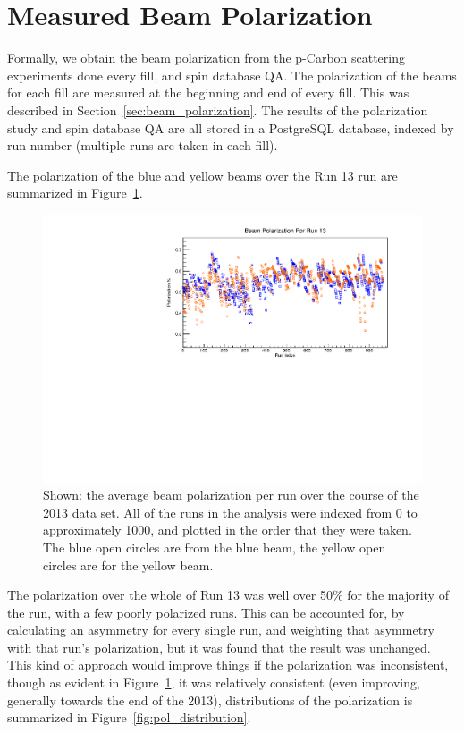 \section{Measured Beam Polarization}

Formally, we obtain the beam polarization from the p-Carbon scattering
experiments done every fill, and spin database QA. The polarization of the beams
for each fill are measured at the beginning and end of every fill. This was
described in Section~\ref{sec:beam_polarization}. The results of the
polarization study and spin database QA are all stored in a PostgreSQL database,
indexed by run number (multiple runs are taken in each fill).

The polarization of the blue and yellow beams over the Run 13 run are summarized
in Figure~\ref{fig:avg_polarization}.

\begin{figure}[ht]
  \centering
  \includegraphics[width=\linewidth]{./figures/beam_polarization.pdf}
  \caption{
    Shown: the average beam polarization per run over the course of the 2013
    data set. All of the runs in the analysis were indexed from 0 to
    approximately 1000, and plotted in the order that they were taken. The blue
    open circles are from the blue beam, the yellow open circles are for the
    yellow beam.
  }
  \label{fig:avg_polarization}
\end{figure}

The polarization over the whole of Run 13 was well over 50\% for the majority of
the run, with a few poorly polarized runs. This can be accounted for, by
calculating an asymmetry for every single run, and weighting that asymmetry with
that run's polarization, but it was found that the result was unchanged. This
kind of approach would improve things if the polarization was inconsistent,
though as evident in Figure~\ref{fig:avg_polarization}, it was relatively
consistent (even improving, generally towards the end of the 2013),
distributions of the polarization is summarized in
Figure~\ref{fig:pol_distribution}.

